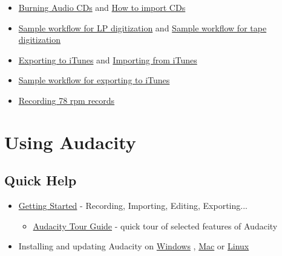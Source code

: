 \begin{multicols}{2}
\begin{itemize}
\item 
\hyperref[\foo{manXburningXmusicXfilesXtoXaXcdX}]{Burning Audio CDs}
 and 
\hyperref[\foo{manXtutorialXhowXtoXimportXcdsX}]{How to import CDs}

\item 
\hyperref[\foo{manXsampleXworkflowXforXlpXdigitizationX}]{Sample workflow for LP digitization}
 and 
\hyperref[\foo{manXsampleXworkflowXforXtapeXdigitizationX}]{Sample workflow for tape digitization}

\end{itemize}

\begin{itemize}
\item 
\hyperref[\foo{manXtutorialXexportingXtoXitunesX}]{Exporting to iTunes}
 and 
\hyperref[\foo{manXtutorialXhowXtoXimportXfilesXfromXitunesX}]{Importing from iTunes}

\item 
\hyperref[\foo{manXsampleXworkflowXforXexportingXtoXitunesX}]{Sample workflow for exporting to iTunes}

\end{itemize}

\begin{itemize}
\item 
\hyperref[\foo{manXrecordingX78XrpmXrecordsX}]{Recording 78 rpm records}

\end{itemize}

\label{indexXbottomXusing}
\label{indexXusing}
\section{Using Audacity}
\subsection{Quick Help}
\begin{itemize}
\item 
\hyperref[\foo{quickXhelpX}]{Getting Started}
 - Recording, Importing, Editing, Exporting...

\begin{itemize}
\item 
\hyperref[\foo{manXaudacityXtourXguideX}]{Audacity Tour Guide}
 - quick tour of selected features of Audacity
\end{itemize}

\item Installing and updating Audacity on 
\hyperref[\foo{manXinstallingXandXupdatingXaudacityXonXwindowsX}]{Windows}
, 
\hyperref[\foo{manXinstallingXandXupdatingXaudacityXonXmacXosXxX}]{Mac}
 or 
\hyperref[\foo{manXinstallingXandXupdatingXaudacityXonXlinuxX}]{Linux}


\end{itemize}
\end{multicols}
